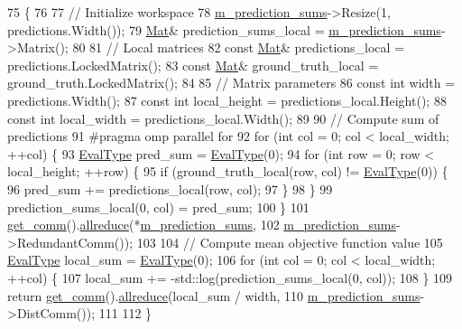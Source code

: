 \begin{DoxyCode}
75                                                                  \{
76 
77   \textcolor{comment}{// Initialize workspace}
78   \hyperlink{classlbann_1_1cross__entropy__with__uncertainty_a4b45767c526e7ebe4a55ff1a1ddbd7ba}{m\_prediction\_sums}->Resize(1, predictions.Width());
79   \hyperlink{base_8hpp_a68f11fdc31b62516cb310831bbe54d73}{Mat}& prediction\_sums\_local = \hyperlink{classlbann_1_1cross__entropy__with__uncertainty_a4b45767c526e7ebe4a55ff1a1ddbd7ba}{m\_prediction\_sums}->Matrix();
80 
81   \textcolor{comment}{// Local matrices}
82   \textcolor{keyword}{const} \hyperlink{base_8hpp_a68f11fdc31b62516cb310831bbe54d73}{Mat}& predictions\_local = predictions.LockedMatrix();
83   \textcolor{keyword}{const} \hyperlink{base_8hpp_a68f11fdc31b62516cb310831bbe54d73}{Mat}& ground\_truth\_local = ground\_truth.LockedMatrix();
84   
85   \textcolor{comment}{// Matrix parameters}
86   \textcolor{keyword}{const} \textcolor{keywordtype}{int} width = predictions.Width();
87   \textcolor{keyword}{const} \textcolor{keywordtype}{int} local\_height = predictions\_local.Height();
88   \textcolor{keyword}{const} \textcolor{keywordtype}{int} local\_width = predictions\_local.Width();
89 
90   \textcolor{comment}{// Compute sum of predictions}
91 \textcolor{preprocessor}{  #pragma omp parallel for}
92   \textcolor{keywordflow}{for} (\textcolor{keywordtype}{int} col = 0; col < local\_width; ++col) \{
93     \hyperlink{base_8hpp_a3266f5ac18504bbadea983c109566867}{EvalType} pred\_sum = \hyperlink{base_8hpp_a3266f5ac18504bbadea983c109566867}{EvalType}(0);
94     \textcolor{keywordflow}{for} (\textcolor{keywordtype}{int} row = 0; row < local\_height; ++row) \{
95       \textcolor{keywordflow}{if} (ground\_truth\_local(row, col) != \hyperlink{base_8hpp_a3266f5ac18504bbadea983c109566867}{EvalType}(0)) \{
96         pred\_sum += predictions\_local(row, col);
97       \}
98     \}
99     prediction\_sums\_local(0, col) = pred\_sum;
100   \}
101   \hyperlink{classlbann_1_1objective__function__term_a5f89b676a26a6b76ddc26563ac87beb9}{get\_comm}().\hyperlink{classlbann_1_1lbann__comm_af5631e5f0f54e4df4958eba9df2599ef}{allreduce}(*\hyperlink{classlbann_1_1cross__entropy__with__uncertainty_a4b45767c526e7ebe4a55ff1a1ddbd7ba}{m\_prediction\_sums},
102                         \hyperlink{classlbann_1_1cross__entropy__with__uncertainty_a4b45767c526e7ebe4a55ff1a1ddbd7ba}{m\_prediction\_sums}->RedundantComm());
103 
104   \textcolor{comment}{// Compute mean objective function value}
105   \hyperlink{base_8hpp_a3266f5ac18504bbadea983c109566867}{EvalType} local\_sum = \hyperlink{base_8hpp_a3266f5ac18504bbadea983c109566867}{EvalType}(0);
106   \textcolor{keywordflow}{for} (\textcolor{keywordtype}{int} col = 0; col < local\_width; ++col) \{
107     local\_sum += -std::log(prediction\_sums\_local(0, col));
108   \}
109   \textcolor{keywordflow}{return} \hyperlink{classlbann_1_1objective__function__term_a5f89b676a26a6b76ddc26563ac87beb9}{get\_comm}().\hyperlink{classlbann_1_1lbann__comm_af5631e5f0f54e4df4958eba9df2599ef}{allreduce}(local\_sum / width,
110                               \hyperlink{classlbann_1_1cross__entropy__with__uncertainty_a4b45767c526e7ebe4a55ff1a1ddbd7ba}{m\_prediction\_sums}->DistComm());
111 
112 \}
\end{DoxyCode}
